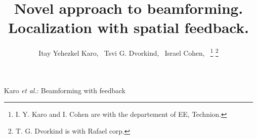 \documentclass[journal]{IEEEtran}
\begin{document}
%
\title{Novel approach to beamforming.\\Localization with spatial feedback.}
%
%
%

\author{Itay Yehezkel Karo,~
        Tsvi G. Dvorkind,~
        Israel Cohen,~
\thanks{I. Y. Karo and I. Cohen are with the departement of EE, Technion.}%
\thanks{T. G. Dvorkind is with Rafael corp.}%
}

% 
%



%
{Karo \MakeLowercase{\textit{et al.}}: Beamforming with feedback}
% 
\end{document}
